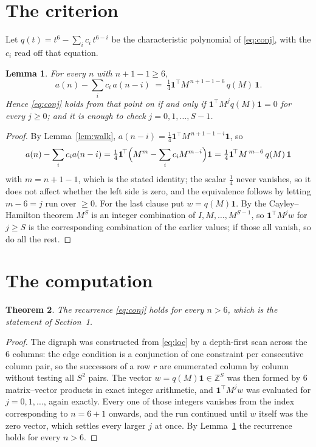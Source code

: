 \documentclass[11pt,a4paper]{article}
\theoremstyle{plain}
\newtheorem{theorem}{Theorem}
\newtheorem{lemma}[theorem]{Lemma}
\theoremstyle{definition}
\begin{document}
\section{The criterion}

Let $q(t)=t^{6}-\sum_i c_i\,t^{6-i}$ be the characteristic polynomial of
\eqref{eq:conj}, with the $c_i$ read off that equation.

\begin{lemma}\label{lem:crit}
For every $n$ with $n+1-1\ge6$,
\[
a(n)-\sum_i c_i\,a(n-i)\;=\;\tfrac1{4}\mathbf{1}^{\!\top}M^{\,n+1-1-6}\,q(M)\,\mathbf{1} .
\]
Hence \eqref{eq:conj} holds from that point on if and only if
$\mathbf{1}^{\!\top}M^{j}q(M)\mathbf{1}=0$ for every $j\ge0$; and it is enough to check
$j=0,1,\dots,S-1$.
\end{lemma}

\begin{proof}
By Lemma~\ref{lem:walk}, $a(n-i)=\tfrac1{4}\mathbf{1}^{\!\top}M^{\,n+1-1-i}\mathbf{1}$, so
\[
a(n)-\sum_i c_i a(n-i)
=\tfrac1{4}\mathbf{1}^{\!\top}\Bigl(M^{m}-\sum_i c_i M^{m-i}\Bigr)\mathbf{1}
=\tfrac1{4}\mathbf{1}^{\!\top}M^{\,m-6}\,q(M)\,\mathbf{1}
\]
with $m=n+1-1$, which is the stated identity; the scalar $\tfrac1{4}$ never vanishes, so it does not affect whether the left side is zero, and the equivalence follows by letting
$m-6=j$ run over $\ge0$. For the last clause put $w=q(M)\mathbf{1}$. By the
Cayley--Hamilton theorem $M^{S}$ is an integer combination of $I,M,\dots,M^{S-1}$, so
$\mathbf{1}^{\!\top}M^{j}w$ for $j\ge S$ is the corresponding combination of the earlier
values; if those all vanish, so do all the rest.
\end{proof}

\section{The computation}

\begin{theorem}
The recurrence \eqref{eq:conj} holds for every $n>6$, which is the statement of
Section~1.
\end{theorem}

\begin{proof}
The digraph was constructed from \eqref{eq:loc} by a depth-first scan across the $6$
columns: the edge condition is a conjunction of one constraint per consecutive column
pair, so the successors of a row $r$ are enumerated column by column without testing all
$S^2$ pairs. The vector $w=q(M)\mathbf{1}\in\mathbb{Z}^{S}$ was then formed by $6$
matrix--vector products in exact integer arithmetic, and $\mathbf{1}^{\!\top}M^{j}w$ was
evaluated for $j=0,1,\dots$, again exactly. Every one of those integers vanishes from the
index corresponding to $n=6+1$ onwards, and the run continued until $w$ itself was the
zero vector, which settles every larger $j$ at once. By Lemma~\ref{lem:crit} the recurrence
holds for every $n>6$.
\end{proof}
\end{document}
